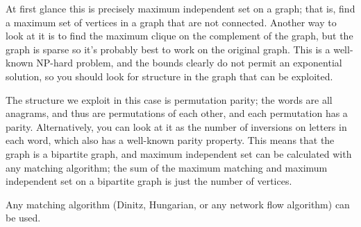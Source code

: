 
\noindent
At first glance this is precisely maximum independent set on a graph;
that is, find a maximum set of vertices in a graph that are not connected.
Another way to look at it is to find the maximum clique on the complement
of the graph, but the graph is sparse so it's probably best to work on
the original graph.  This is a well-known NP-hard problem, and the
bounds clearly do not permit an exponential solution, so you should look
for structure in the graph that can be exploited.

The structure we exploit in this case is permutation parity; the words
are all anagrams, and thus are permutations of each other, and each
permutation has a parity.  Alternatively, you can look at it as the
number of inversions on letters in each word, which also has a well-known
parity property.  This means that the graph is a bipartite graph, and
maximum independent set can be calculated with any matching algorithm;
the sum of the maximum matching and maximum independent set on a
bipartite graph is just the number of vertices.

Any matching algorithm (Dinitz, Hungarian, or any network flow
algorithm) can be used.
